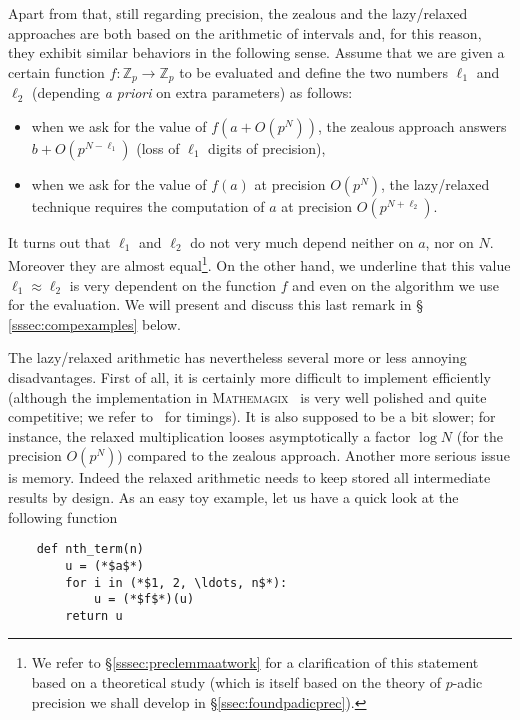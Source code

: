 \documentclass[11pt]{article}
\numberwithin{equation}{section}
\numberwithin{figure}{section}
\theoremstyle{definition}
\newcommand{\Z}{\mathbb Z}
\newcommand{\Zp}{\Z_p}
\newcommand{\mathemagix}{\textsc{Mathemagix}~\cite{mathemagix}\xspace}
\begin{document}
Apart from that, still regarding precision, the zealous and the 
lazy/relaxed approaches are both based on the arithmetic of intervals 
and, for this reason, they exhibit similar behaviors in the following 
sense. Assume that we are given a certain function $f : \Zp \to \Zp$ to 
be evaluated and define the two numbers $\ell_1$ and $\ell_2$ (depending 
\emph{a priori} on extra parameters) as follows:
\begin{itemize}
\renewcommand{\itemsep}{0pt}
\item when we ask for the value of $f(a + O(p^N))$, the zealous 
approach answers $b + O(p^{N-\ell_1})$ (loss of $\ell_1$ digits of 
precision),
\item when we ask for the value of $f(a)$ at precision $O(p^N)$, 
the lazy/relaxed technique requires the computation of $a$ at precision 
$O(p^{N+\ell_2})$.
\end{itemize}
It turns out that $\ell_1$ and $\ell_2$ do not very much depend 
neither on $a$, nor on $N$. Moreover they are almost 
equal\footnote{We refer to \S \ref{sssec:preclemmaatwork} for a 
clarification of this statement based on a theoretical study (which
is itself based on the theory of $p$-adic precision we shall develop
in \S \ref{ssec:foundpadicprec}).}. On the 
other hand, we underline that this value $\ell_1 \approx \ell_2$ is very 
dependent on the function $f$ and even on the algorithm we use for the 
evaluation. We will present and discuss this last remark in \S 
\ref{sssec:compexamples} below.

\medskip

The lazy/relaxed arithmetic has nevertheless several more or less 
annoying disadvantages. First of all, it is
certainly more difficult to implement efficiently (although the 
implementation in \mathemagix is very well polished and quite 
competitive; we refer to~\cite{BeHoLe11} for timings). It is also 
supposed to be a bit slower; for instance, the relaxed multiplication 
looses asymptotically a factor $\log N$ (for the precision $O(p^N)$) 
compared to the zealous approach.
Another more serious issue is memory. Indeed the relaxed arithmetic 
needs to keep stored all intermediate results by design. As an easy 
toy example, let us have a quick look at the following function

\begin{lstlisting}
    def nth_term(n)
        u = (*$a$*)
        for i in (*$1, 2, \ldots, n$*):
            u = (*$f$*)(u)
        return u
\end{lstlisting}
\end{document}
